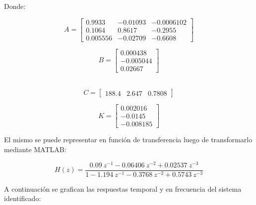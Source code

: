 Donde:

\vspace{-0.5cm}
\begin{equation}
    A = \begin{bmatrix}
        0.9933   &   -0.01093    &   -0.0006102\\
        0.1064   &   0.8617      &   -0.2955   \\
        0.005556 &   -0.02709    &   -0.6608            
    \end{bmatrix}
\end{equation}

\vspace{-0.5cm}
\begin{equation}
    B = \begin{bmatrix}
        0.000438   \\
        -0.005044  \\
        0.02667
    \end{bmatrix}
\end{equation}\

\vspace{-0.5cm}
\begin{equation}
    C = \begin{bmatrix}
        188.4 & 2.647 & 0.7808
    \end{bmatrix}
\end{equation}

\vspace{-0.75cm}
\begin{equation}
    K = \begin{bmatrix}
        0.002016 \\
        -0.0145   \\
        -0.008185
    \end{bmatrix}
\end{equation}

El mismo se puede representar en función de transferencia luego de transformarlo mediante MATLAB:

\vspace{-0.5cm}
\begin{equation}
    H(z) = \dfrac{0.09\ z^{-1} - 0.06406\ z^{-2} + 0.02537\ z^{-3}}{1 - 1.194\ z^{-1} - 0.3768\ z^{-2} + 0.5743\ z^{-3}}
\end{equation}
\vspace{-0.5cm}

A continuación se grafican las respuestas temporal y en frecuencia del sistema identificado:

